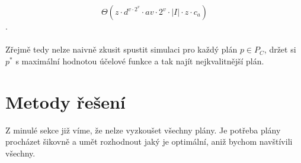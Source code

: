 $$
  \Theta{(z \cdot d^{v \cdot 2^v} \cdot av \cdot 2^v \cdot |I| \cdot z \cdot c_a)}
$$
.
\\
\\
Zřejmě tedy nelze naivně zkusit spustit simulaci pro každý plán $p \in P_C$, držet si $p^*$ s maximální hodnotou účelové funkce a tak najít nejkvalitnější plán.

\section{Metody řešení}

Z minulé sekce již víme, že nelze vyzkoušet všechny plány. Je potřeba plány procházet šikovně a umět rozhodnout jaký je optimální, aniž bychom navštívili všechny.
